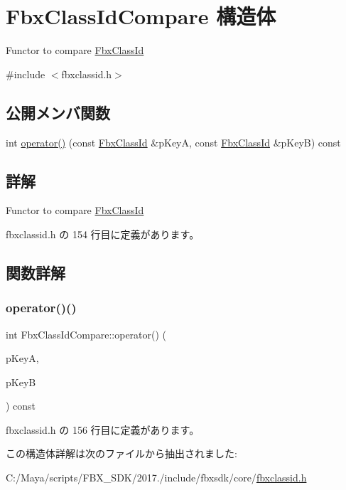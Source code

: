 \hypertarget{struct_fbx_class_id_compare}{}\section{Fbx\+Class\+Id\+Compare 構造体}
\label{struct_fbx_class_id_compare}


Functor to compare \hyperlink{class_fbx_class_id}{Fbx\+Class\+Id}  




{\ttfamily \#include $<$fbxclassid.\+h$>$}

\subsection*{公開メンバ関数}
\begin{DoxyCompactItemize}
\item 
int \hyperlink{struct_fbx_class_id_compare_a51c9a9d6cc4476af0e40eef1f710b948}{operator()} (const \hyperlink{class_fbx_class_id}{Fbx\+Class\+Id} \&p\+KeyA, const \hyperlink{class_fbx_class_id}{Fbx\+Class\+Id} \&p\+KeyB) const
\end{DoxyCompactItemize}


\subsection{詳解}
Functor to compare \hyperlink{class_fbx_class_id}{Fbx\+Class\+Id} 

 fbxclassid.\+h の 154 行目に定義があります。



\subsection{関数詳解}
\mbox{\label{struct_fbx_class_id_compare_a51c9a9d6cc4476af0e40eef1f710b948}} 
\subsubsection{\texorpdfstring{operator()()}{operator()()}}
{\footnotesize\ttfamily int Fbx\+Class\+Id\+Compare\+::operator() (\begin{DoxyParamCaption}\item[{const \hyperlink{class_fbx_class_id}{Fbx\+Class\+Id} \&}]{p\+KeyA,  }\item[{const \hyperlink{class_fbx_class_id}{Fbx\+Class\+Id} \&}]{p\+KeyB }\end{DoxyParamCaption}) const\hspace{0.3cm}{\ttfamily [inline]}}



 fbxclassid.\+h の 156 行目に定義があります。



この構造体詳解は次のファイルから抽出されました\+:\begin{DoxyCompactItemize}
\item 
C\+:/\+Maya/scripts/\+F\+B\+X\+\_\+\+S\+D\+K/2017./include/fbxsdk/core/\hyperlink{fbxclassid_8h}{fbxclassid.\+h}\end{DoxyCompactItemize}
